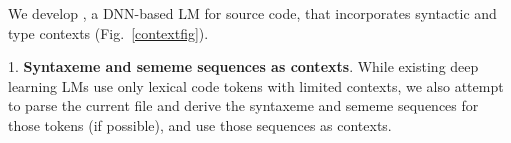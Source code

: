 

We develop {\bf {\tool}}, a DNN-based LM for source
code, that 
incorporates syntactic and type contexts (Fig.~\ref{contextfig}).




1. {\bf Syntaxeme and sememe sequences as contexts}. While existing
deep learning LMs use only lexical code tokens with limited contexts,
we also attempt to parse the current file and derive the syntaxeme and
sememe sequences for those tokens (if possible), and use those
sequences as contexts. 



